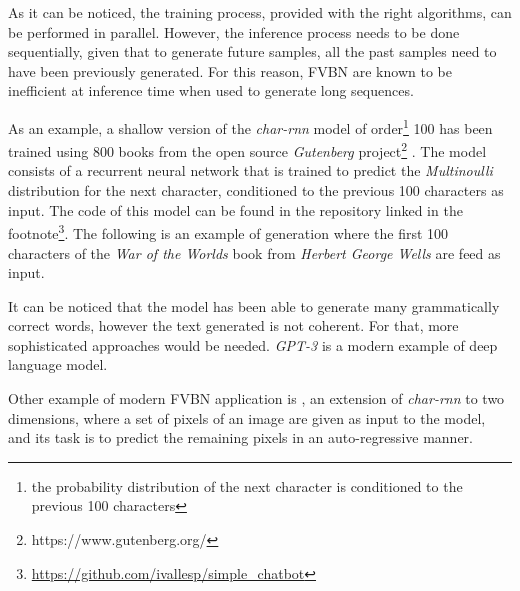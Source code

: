 As it can be noticed, the training process, provided with the right algorithms, can be performed in parallel. However, the inference process needs to be done sequentially, given that to generate future samples, all the past samples need to have been previously generated. For this reason, FVBN are known to be inefficient at inference time when used to generate long sequences.

As an example, a shallow version of the \textit{char-rnn} model of order\footnote{the probability distribution of the next character is conditioned to the previous 100 characters} 100 has been trained using 800 books from the open source \textit{Gutenberg} project\footnote{https://www.gutenberg.org/} \autocite{gerlach2020}. The model consists of a recurrent neural network that is trained to predict the \textit{Multinoulli} distribution for the next character, conditioned to the previous 100 characters as input. The code of this model can be found in the repository linked in the footnote\footnote{\url{https://github.com/ivallesp/simple_chatbot}}. The following is an example of generation where the first 100 characters of the \textit{War of the Worlds} book from \textit{Herbert George Wells} are feed as input.


It can be noticed that the model has been able to generate many grammatically correct words, however the text generated is not coherent. For that, more sophisticated approaches would be needed. \textit{GPT-3} \autocite{floridi2020} is a modern example of deep language model.

Other example of modern FVBN application is \autocite{Oord2016, Oord2016b}, an extension of \textit{char-rnn} to two dimensions, where a set of pixels of an image are given as input to the model, and its task is to predict the remaining pixels in an auto-regressive manner. 


